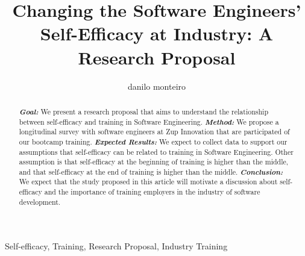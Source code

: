 \documentclass[10pt, conference]{IEEEtran}
\author{danilo monteiro}
\begin{document}
\title{Changing the Software Engineers' Self-Efficacy at Industry: A Research Proposal}


\author{
\and
{}
\and
{}

}

\maketitle

\begin{abstract}
\textbf{\textit{Goal: }}We present a research proposal that aims to understand the relationship between self-efficacy and training in Software Engineering. \textbf{\textit{Method:}} We propose a longitudinal survey with software engineers at Zup Innovation that are participated of our bootcamp training. \textbf{\textit{Expected Results:}} We expect to collect data to support our assumptions that self-efficacy can be related to training in Software Engineering. Other assumption is that self-efficacy at the beginning of training is higher than the middle, and that self-efficacy at the end of training is higher than the middle. \textbf{\textit{Conclusion:}} We expect that the study proposed in this article will motivate a discussion about self-efficacy and the importance of training employers in the industry of software development.
\end{abstract}

\begin{IEEEkeywords}
Self-efficacy, Training, Research Proposal, Industry Training
\end{IEEEkeywords}
\end{document}
